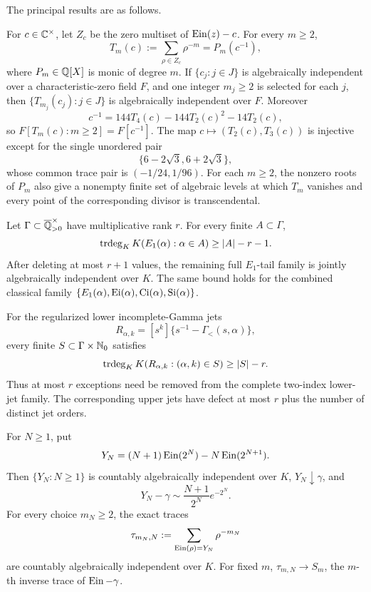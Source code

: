 The principal results are as follows.

\begin{theorem}
\label{thm:intro-universal}
For \(c\in\mathbb C^\times\), let \(Z_c\) be the zero multiset of
\(\operatorname{Ein}(z)-c\).  For every \(m\ge2\),
\[
 T_m(c):=\sum_{\rho\in Z_c}\rho^{-m}=P_m(c^{-1}),
\]
where \(P_m\in\mathbb Q[X]\) is monic of degree \(m\).  If
\(\{c_j:j\in J\}\) is algebraically independent over a characteristic-zero
field \(F\), and one integer \(m_j\ge2\) is selected for each \(j\), then
\(\{T_{m_j}(c_j):j\in J\}\) is algebraically independent over \(F\).
Moreover
\[
 c^{-1}=144T_4(c)-144T_2(c)^2-14T_2(c),
\]
so \(F[T_m(c):m\ge2]=F[c^{-1}]\).
The map \(c\mapsto(T_2(c),T_3(c))\) is injective except for the single
unordered pair
\[
 \{6-2\sqrt3,6+2\sqrt3\},
\]
whose common trace pair is \((-1/24,1/96)\).  For each \(m\ge2\), the
nonzero roots of \(P_m\) also give a nonempty finite set of algebraic levels
at which \(T_m\) vanishes and every point of the corresponding divisor is
transcendental.
\end{theorem}

\begin{theorem}
\label{thm:intro-tail-closures}
Let \(\Gamma\subset\overline{\mathbb Q}_{>0}^{\times}\) have multiplicative rank \(r\).
For every finite \(A\subset\Gamma\),
\[
 \operatorname{trdeg}_KK(E_1(\alpha):\alpha\in A)\ge |A|-r-1.
\]
After deleting at most \(r+1\) values, the remaining full \(E_1\)-tail
family is jointly algebraically independent over \(K\).  The same bound
holds for the combined classical family
\(\{E_1(\alpha),\operatorname{Ei}(\alpha),\operatorname{Ci}(\alpha),\operatorname{Si}(\alpha)\}\).

For the regularized lower incomplete-Gamma jets
\[
 R_{\alpha,k}=[s^k]\{s^{-1}-\Gamma_{<}(s,\alpha)\},
\]
every finite \(S\subset\Gamma\times\mathbb N_0\) satisfies
\[
 \operatorname{trdeg}_KK(R_{\alpha,k}:(\alpha,k)\in S)\ge |S|-r.
\]
Thus at most \(r\) exceptions need be removed from the complete two-index
lower-jet family.  The corresponding upper jets have defect at most
\(r\) plus the number of distinct jet orders.
\end{theorem}

\begin{theorem}
\label{thm:intro-dyadic}
For \(N\ge1\), put
\[
 Y_N=(N+1)\operatorname{Ein}(2^N)-N\operatorname{Ein}(2^{N+1}).
\]
Then \(\{Y_N:N\ge1\}\) is countably algebraically independent over \(K\),
\(Y_N\downarrow\gamma\), and
\[
 Y_N-\gamma\sim \frac{N+1}{2^N}e^{-2^N}.
\]
For every choice \(m_N\ge2\), the exact traces
\[
 \tau_{m_N,N}:=\sum_{\operatorname{Ein}(\rho)=Y_N}\rho^{-m_N}
\]
are countably algebraically independent over \(K\).  For fixed \(m\),
\(\tau_{m,N}\to S_m\), the \(m\)-th inverse trace of \(\operatorname{Ein}-\gamma\).
\end{theorem}

